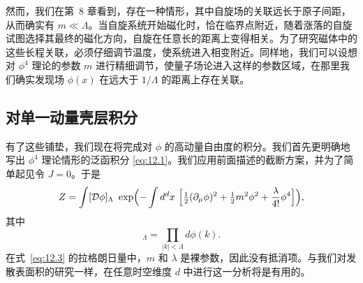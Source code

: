 然而，我们在第~8 章看到，存在一种情形，其中自旋场的关联远长于原子间距，从而确实有 $m \ll \Lambda$。当自旋系统开始磁化时，恰在临界点附近，随着涨落的自旋试图选择其最终的磁化方向，自旋在任意长的距离上变得相关。为了研究磁体中的这些长程关联，必须仔细调节温度，使系统进入相变附近。同样地，我们可以设想对 $\phi^4$ 理论的参数 $m$ 进行精细调节，使量子场论进入这样的参数区域，在那里我们确实发现场 $\phi(x)$ 在远大于 $1/\Lambda$ 的距离上存在关联。

\subsection{对单一动量壳层积分}

有了这些铺垫，我们现在将完成对 $\phi$ 的高动量自由度的积分。我们首先更明确地写出 $\phi^4$ 理论情形的泛函积分 \eqref{eq:12.1}。我们应用前面描述的截断方案，并为了简单起见令 $J = 0$。于是
\begin{equation}
  Z = \int [\mathcal{D}\phi]_\Lambda\ \exp\Bigl( -\int d^dx\ \Bigl[
    \tfrac{1}{2}(\partial_\mu\phi)^2 + \tfrac{1}{2}m^2\phi^2
    + \frac{\lambda}{4!}\phi^4 \Bigr] \Bigr),
  \label{eq:12.3}
\end{equation}
其中
\begin{equation}
  [\mathcal{D}\phi]_\Lambda = \prod_{|k|<\Lambda} d\phi(k) .
  \label{eq:12.4}
\end{equation}
在式~\eqref{eq:12.3} 的拉格朗日量中，$m$ 和 $\lambda$ 是裸参数，因此没有抵消项。与我们对发散表面积的研究一样，在任意时空维度 $d$ 中进行这一分析将是有用的。


